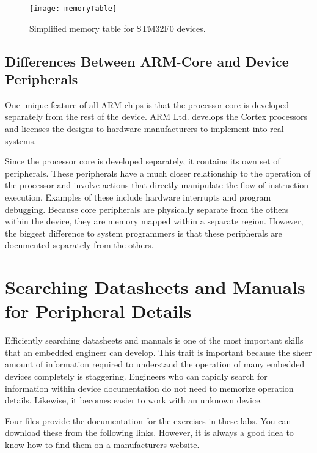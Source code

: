 \documentclass[11pt,fleqn]{book} %
\begin{document}
\begin{figure}[]
    \centering\texttt{[image: memoryTable]}
    \caption{Simplified memory table for STM32F0 devices.}
    \label{memoryTable}
\end{figure}


\subsection{Differences Between ARM-Core and Device Peripherals}

One unique feature of all ARM chips is that the processor core is developed separately from the rest of the device. ARM Ltd. develops the Cortex processors and licenses the designs to hardware manufacturers to implement into real systems. 

Since the processor core is developed separately, it contains its own set of peripherals. These peripherals have a much closer relationship to the operation of the processor and involve actions that directly manipulate the flow of instruction execution. Examples of these include hardware interrupts and program debugging. Because core peripherals are physically separate from the others within the device, they are memory mapped within a separate region. However, the biggest difference to system programmers is that these peripherals are documented separately from the others.

\section{Searching Datasheets and Manuals for Peripheral Details}

Efficiently searching datasheets and manuals is one of the most important skills that an embedded engineer can develop. This trait is important because the sheer amount of information required to understand the operation of many embedded devices completely is staggering. 
Engineers who can rapidly search for information within device documentation do not need to memorize operation details. Likewise, it becomes easier to work with an unknown device. 

Four files provide the documentation for the exercises in these labs. You can download these from the following links. However, it is always a good idea to know how to find them on a manufacturers website.
\end{document}
